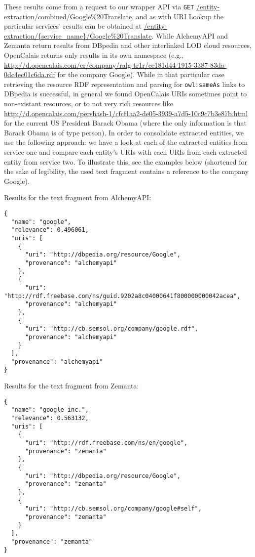 \documentclass{acm_proc_article-sp}
\begin{document}

These results come from a request to our wrapper API via \texttt{GET} \url{/entity-extraction/combined/Google%20Translate}, and as with URI Lookup the particular services' results can be obtained at \url{/entity-extraction/{service_name}/Google%

Results for the text fragment from AlchemyAPI:
\begin{lstlisting}
{
  "name": "google",
  "relevance": 0.496061,
  "uris": [
    {
      "uri": "http://dbpedia.org/resource/Google",
      "provenance": "alchemyapi" 
    },
    {
      "uri": "http://rdf.freebase.com/ns/guid.9202a8c04000641f800000000042acea",
      "provenance": "alchemyapi" 
    },
    {
      "uri": "http://cb.semsol.org/company/google.rdf",
      "provenance": "alchemyapi" 
    } 
  ],
  "provenance": "alchemyapi" 
}
\end{lstlisting}

Results for the text fragment from Zemanta:
\begin{lstlisting}
{
  "name": "google inc.",
  "relevance": 0.563132,
  "uris": [
    {
      "uri": "http://rdf.freebase.com/ns/en/google",
      "provenance": "zemanta" 
    },
    {
      "uri": "http://dbpedia.org/resource/Google",
      "provenance": "zemanta" 
    },
    {
      "uri": "http://cb.semsol.org/company/google#self",
      "provenance": "zemanta" 
    } 
  ],
  "provenance": "zemanta" 
}
\end{lstlisting}
\end{document}
